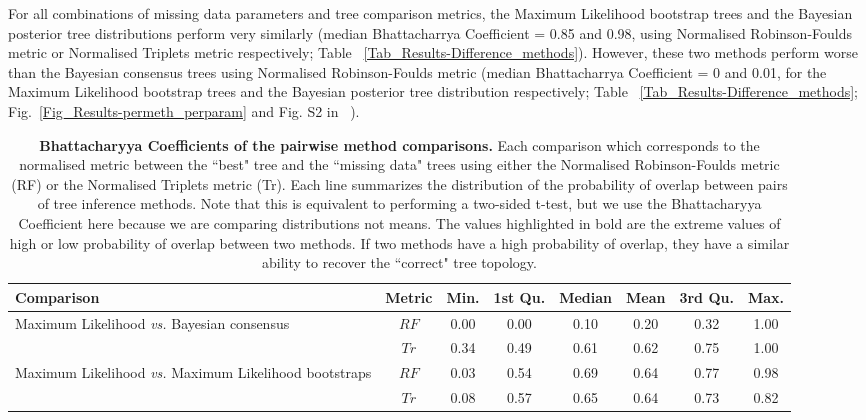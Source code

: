 \documentclass[10pt,letterpaper]{article}
\begin{document}
For all combinations of missing data parameters and tree comparison metrics, the Maximum Likelihood bootstrap trees and the Bayesian posterior tree distributions perform very similarly (median Bhattacharrya Coefficient = 0.85 and 0.98, using Normalised Robinson-Foulds metric or Normalised Triplets metric respectively; Table ~\ref{Tab_Results-Difference_methods}). However, these two methods perform worse than the Bayesian consensus trees using Normalised Robinson-Foulds metric (median Bhattacharrya Coefficient = 0 and 0.01, for the Maximum Likelihood bootstrap trees and the Bayesian posterior tree distribution respectively; Table ~\ref{Tab_Results-Difference_methods}; Fig.~\ref{Fig_Results-permeth_perparam} and Fig. S2 in ~).

\begin{table}[!ht]
\begin{adjustwidth}{-2.25in}{0in} %
\caption{{\bf Bhattacharyya Coefficients of the pairwise method comparisons.}
Each comparison which corresponds to the normalised metric between the ``best" tree and the ``missing data" trees using either the Normalised Robinson-Foulds metric (RF) or the Normalised Triplets metric (Tr). Each line summarizes the distribution of the probability of overlap between pairs of tree inference methods. Note that this is equivalent to performing a two-sided t-test, but we use the Bhattacharyya Coefficient here because we are comparing distributions not means. The values highlighted in bold are the extreme values of high or low probability of overlap between two methods. If two methods have a high probability of overlap, they have a similar ability to recover the ``correct" tree topology.}
\centering
\begin{tabular}{|l|c|c|c|c|c|c|c|}
  \hline
 Comparison &  Metric & Min. & 1st Qu. & Median & Mean & 3rd Qu. & Max. \\ 
  \hline
    Maximum Likelihood \textit{vs.} Bayesian consensus                 & $RF$ & 0.00 & 0.00 & 0.10 & 0.20 & 0.32 & 1.00 \\ 
                                                                       & $Tr$ & 0.34 & 0.49 & 0.61 & 0.62 & 0.75 & 1.00 \\ 
    Maximum Likelihood \textit{vs.} Maximum Likelihood bootstraps      & $RF$ & 0.03 & 0.54 & 0.69 & 0.64 & 0.77 & 0.98 \\ 
                                                                       & $Tr$ & 0.08 & 0.57 & 0.65 & 0.64 & 0.73 & 0.82 \\ 

\end{tabular}
\end{adjustwidth}
\end{table}
\end{document}
